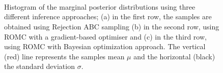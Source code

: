 

\begin{figure}[ht]
  \begin{center}
    
    \\
    
    \\
    
    \\
    \end{center}
    \caption[MA2 example, evaluation of the marginal
    distributions.]{Histogram of the marginal posterior distributions
      using three different inference approaches; (a) in the first
      row, the samples are obtained using Rejection ABC sampling (b)
      in the second row, using ROMC with a gradient-based optimiser
      and (c) in the third row, using ROMC with Bayesian optimization
      approach. The vertical (red) line represents the samples mean
      $\mu$ and the horizontal (black) the standard deviation
      $\sigma$.}
  \label{fig:ma2_3}
\end{figure}



